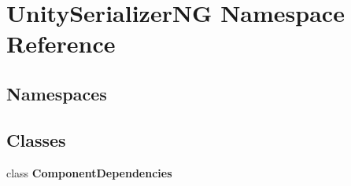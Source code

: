 \hypertarget{namespace_unity_serializer_n_g}{}\section{Unity\+Serializer\+NG Namespace Reference}
\label{namespace_unity_serializer_n_g}
\subsection*{Namespaces}
\begin{DoxyCompactItemize}
\end{DoxyCompactItemize}
\subsection*{Classes}
\begin{DoxyCompactItemize}
\item 
class {\bfseries Component\+Dependencies}
\end{DoxyCompactItemize}
